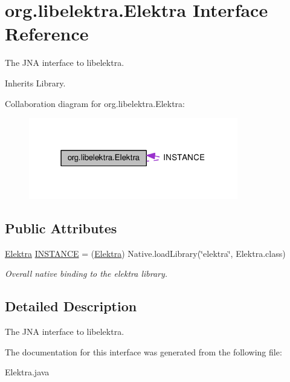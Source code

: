 \hypertarget{interfaceorg_1_1libelektra_1_1Elektra}{}\section{org.\+libelektra.\+Elektra Interface Reference}
\label{interfaceorg_1_1libelektra_1_1Elektra}


The J\+NA interface to libelektra.  




Inherits Library.



Collaboration diagram for org.\+libelektra.\+Elektra\+:
\nopagebreak
\begin{figure}[H]
\begin{center}
\leavevmode
\includegraphics[width=259pt]{interfaceorg_1_1libelektra_1_1Elektra__coll__graph}
\end{center}
\end{figure}
\subsection*{Public Attributes}
\begin{DoxyCompactItemize}
\item 
\mbox{\label{interfaceorg_1_1libelektra_1_1Elektra_a5a69a68a26ccec272c0f992f0a94a4cc}} 
\hyperlink{interfaceorg_1_1libelektra_1_1Elektra}{Elektra} \hyperlink{interfaceorg_1_1libelektra_1_1Elektra_a5a69a68a26ccec272c0f992f0a94a4cc}{I\+N\+S\+T\+A\+N\+CE} = (\hyperlink{interfaceorg_1_1libelektra_1_1Elektra}{Elektra}) Native.\+load\+Library(\char`\"{}elektra\char`\"{}, Elektra.\+class)
\begin{DoxyCompactList}\small\item\em Overall native binding to the elektra library. \end{DoxyCompactList}\end{DoxyCompactItemize}


\subsection{Detailed Description}
The J\+NA interface to libelektra. 

The documentation for this interface was generated from the following file\+:\begin{DoxyCompactItemize}
\item 
Elektra.\+java\end{DoxyCompactItemize}
